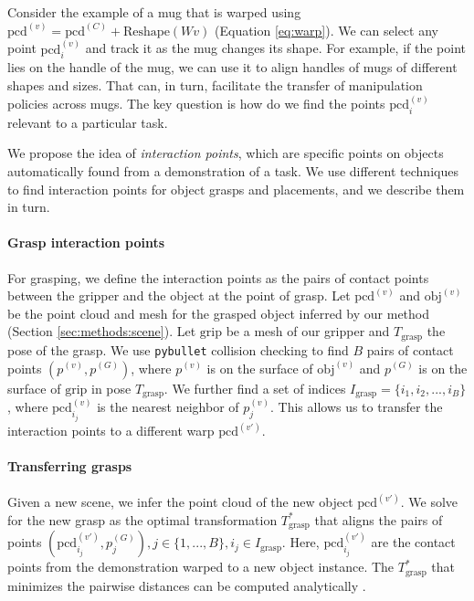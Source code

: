 \documentclass{article}
\newcommand{\pcx}[1]{\mathrm{pcd}^{(#1)}}
\newcommand{\pcc}{\pcx{C}}
\begin{document}

Consider the example of a mug that is warped using $\pcx{v} = \pcc + \mathrm{Reshape}(W v)$ (Equation \ref{eq:warp}). We can select any point $\pcx{v}_i$ and track it as the mug changes its shape. For example, if the point lies on the handle of the mug, we can use it to align handles of mugs of different shapes and sizes. That can, in turn, facilitate the transfer of manipulation policies across mugs. The key question is how do we find the points $\pcx{v}_i$ relevant to a particular task.

We propose the idea of \textit{interaction points}, which are specific points on objects automatically found from a demonstration of a task. We use different techniques to find interaction points for object grasps and placements, and we describe them in turn.

\paragraph{Grasp interaction points} For grasping, we define the interaction points as the pairs of contact points between the gripper and the object at the point of grasp. Let $\mathrm{pcd}^{(v)}$ and $\mathrm{obj}^{(v)}$ be the point cloud and mesh for the grasped object inferred by our method (Section \ref{sec:methods:scene}). Let $\mathrm{grip}$ be a mesh of our gripper and $T_{\mathrm{grasp}}$ the pose of the grasp. We use \texttt{pybullet} collision checking to find $B$ pairs of contact points $ (p^{(v)}, p^{(G)})$, where $p^{(v)}$ is on the surface of $\mathrm{obj}^{(v)}$ and $p^{(G)}$ is on the surface of $\mathrm{grip}$ in pose $T_{\mathrm{grasp}}$. We further find a set of indices $I_{\mathrm{grasp}} = \{i_1, i_2, ..., i_B\}$, where $\pcx{v}_{i_j}$ is the nearest neighbor of $p^{(v)}_j$. This allows us to transfer the interaction points to a different warp $\pcx{v'}$.

\paragraph{Transferring grasps} Given a new scene, we infer the point cloud of the new object $\pcx{v'}$. We solve for the new grasp as the optimal transformation $T_{\mathrm{grasp}}^*$ that aligns the pairs of points $(\pcx{v'}_{i_j}, p^{(G)}_j), j \in \{1, ..., B\}, i_j \in I_{\mathrm{grasp}}$. Here, $\pcx{v'}_{i_j}$ are the contact points from the demonstration warped to a new object instance. The $T_{\mathrm{grasp}}^*$ that minimizes the pairwise distances can be computed analytically \cite{horn88computation}.
\end{document}
